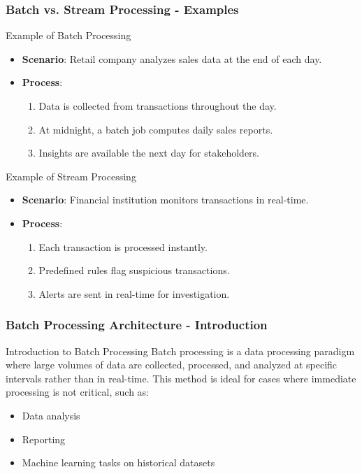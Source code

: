 \documentclass[aspectratio=169]{beamer}
\begin{document}
\begin{frame}[fragile]
    \frametitle{Batch vs. Stream Processing - Examples}
    \begin{block}{Example of Batch Processing}
        \begin{itemize}
            \item \textbf{Scenario}: Retail company analyzes sales data at the end of each day.
            \item \textbf{Process}:
                \begin{enumerate}
                    \item Data is collected from transactions throughout the day.
                    \item At midnight, a batch job computes daily sales reports.
                    \item Insights are available the next day for stakeholders.
                \end{enumerate}
        \end{itemize}
    \end{block}
    
    \begin{block}{Example of Stream Processing}
        \begin{itemize}
            \item \textbf{Scenario}: Financial institution monitors transactions in real-time.
            \item \textbf{Process}:
                \begin{enumerate}
                    \item Each transaction is processed instantly.
                    \item Predefined rules flag suspicious transactions.
                    \item Alerts are sent in real-time for investigation.
                \end{enumerate}
        \end{itemize}
    \end{block}
\end{frame}

\begin{frame}[fragile]
    \frametitle{Batch Processing Architecture - Introduction}
    \begin{block}{Introduction to Batch Processing}
        Batch processing is a data processing paradigm where large volumes of data are collected, processed, and analyzed at specific intervals rather than in real-time. 
        This method is ideal for cases where immediate processing is not critical, such as:
        \begin{itemize}
            \item Data analysis
            \item Reporting
            \item Machine learning tasks on historical datasets
        \end{itemize}
    \end{block}
\end{frame}
\end{document}
